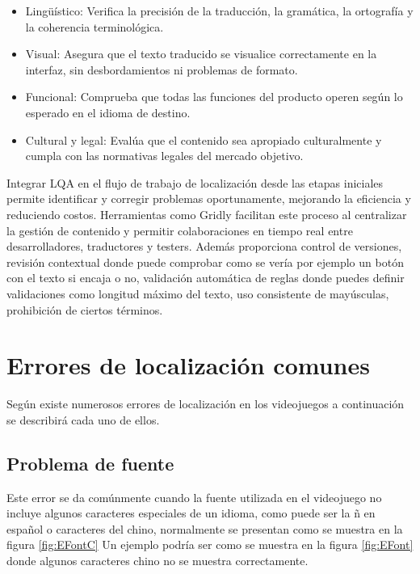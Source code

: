 \begin{itemize}
\item Lingüístico: Verifica la precisión de la traducción, la gramática, la ortografía y la coherencia terminológica.
\item Visual: Asegura que el texto traducido se visualice correctamente en la interfaz, sin desbordamientos ni problemas de formato.
\item Funcional: Comprueba que todas las funciones del producto operen según lo esperado en el idioma de destino.
\item Cultural y legal: Evalúa que el contenido sea apropiado culturalmente y cumpla con las normativas legales del mercado objetivo.

\end{itemize}

Integrar LQA en el flujo de trabajo de localización desde las etapas iniciales permite identificar y corregir problemas oportunamente, mejorando la eficiencia y reduciendo costos. Herramientas como Gridly facilitan este proceso al centralizar la gestión de contenido y permitir colaboraciones en tiempo real entre desarrolladores, traductores y testers. Además proporciona control de versiones, revisión contextual donde puede comprobar como se vería por ejemplo un botón con el texto si encaja o no, validación automática de reglas donde puedes definir validaciones como longitud máximo del texto, uso consistente de mayúsculas, prohibición de ciertos términos.



\section{Errores de localización comunes}
\label{sec:Errores de localizacion}
Según \cite{LQAPSM2017} existe numerosos errores de localización en los videojuegos a continuación se describirá cada uno de ellos.

\subsection{Problema de fuente} \label{ErrorFuente}
Este error se da comúnmente cuando la fuente utilizada en el videojuego no incluye algunos caracteres especiales de un idioma, como puede ser la ñ en español o caracteres del chino, normalmente se presentan como se muestra en la figura \ref{fig:EFontC}
Un ejemplo podría ser como se muestra en la figura \ref{fig:EFont} donde algunos caracteres chino no se muestra correctamente. 

